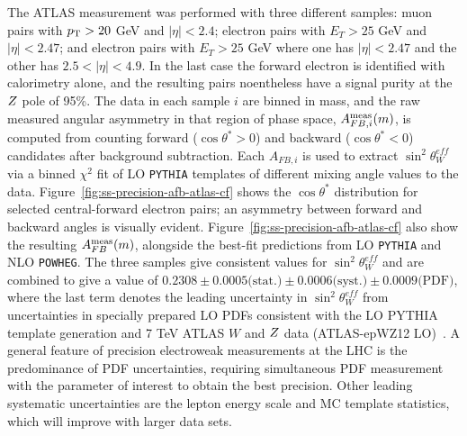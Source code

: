 The ATLAS measurement was performed with three different samples: muon
pairs with $p_{\mathrm{T}} > 20$ GeV and $|\eta| < 2.4$; electron pairs with $E_T
> 25$ GeV and $|\eta| < 2.47$; and electron pairs with $E_T > 25$ GeV
where one has $|\eta| < 2.47$ and the other has $2.5 < |\eta| < 4.9$.
In the last case the forward electron is identified with calorimetry
alone, and the resulting pairs noentheless have a signal purity at the
$Z$ pole of 95\%.  The data in each sample $i$ are binned in mass, and
the raw measured angular asymmetry in that region of phase space,
$A^{\rm meas}_{FB, i}(m)$, is computed from counting forward
($\cos\theta^* > 0$) and backward ($\cos\theta^* < 0$) candidates
after background subtraction.  Each $A_{FB,i}$ is used to extract
$\sin^2\theta^{eff}_{W}$ via a binned $\chi^2$ fit of
LO \texttt{PYTHIA} templates of different mixing angle values to the
data.  Figure~\ref{fig:ss-precision-afb-atlas-cf} shows the
$\cos\theta^*$ distribution for selected central-forward electron
pairs; an asymmetry between forward and backward angles is visually
evident.  Figure~\ref{fig:ss-precision-afb-atlas-cf} also show the
resulting $A^{\rm meas}_{FB}(m)$, alongside the best-fit predictions
from LO \texttt{PYTHIA} and NLO \texttt{POWHEG}.  The three samples
give consistent values for $\sin^2\theta^{eff}_{W}$ and are combined
to give a value of $0.2308 \pm 0.0005\textrm{(stat.)} \pm
0.0006\textrm{(syst.)} \pm 0.0009\textrm{(PDF)}$, where the last term
denotes the leading uncertainty in $\sin^2\theta^{eff}_{W}$ from
uncertainties in specially prepared LO PDFs consistent with the LO
PYTHIA template generation and 7 TeV ATLAS $W$ and $Z$ data
(ATLAS-epWZ12 LO)~\cite{Aad:2011dm}.  A general feature of precision
electroweak measurements at the LHC is the predominance of PDF
uncertainties, requiring simultaneous PDF measurement with the
parameter of interest to obtain the best precision.  Other leading
systematic uncertainties are the lepton energy scale and MC template
statistics, which will improve with larger data sets.

